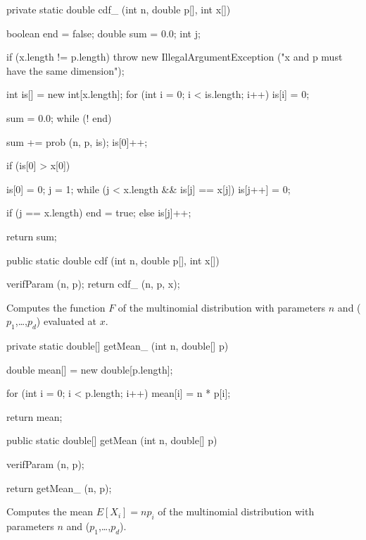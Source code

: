 \begin{code}\begin{hide}

   private static double cdf_ (int n, double p[], int x[]) {
      boolean end = false;
      double sum = 0.0;
      int j;

      if (x.length != p.length)
         throw new IllegalArgumentException ("x and p must have the same dimension");

      int is[] = new int[x.length];
      for (int i = 0; i < is.length; i++)
         is[i] = 0;

      sum = 0.0;
      while (! end) {
         sum += prob (n, p, is);
         is[0]++;

         if (is[0] > x[0]) {
            is[0] = 0;
            j = 1;
            while (j < x.length && is[j] == x[j])
               is[j++] = 0;

            if (j == x.length)
               end = true;
            else
               is[j]++;
         }
      }

      return sum;
   }\end{hide}

   public static double cdf (int n, double p[], int x[])\begin{hide} {
      verifParam (n, p);
      return cdf_ (n, p, x);
   }\end{hide}
\end{code}
\begin{tabb}
   Computes the function $F$ of the multinomial distribution with
   parameters $n$ and ($p_1$,\ldots,$p_d$) evaluated at $x$.
\end{tabb}
\begin{code}\begin{hide}

   private static double[] getMean_ (int n, double[] p) {
      double mean[] = new double[p.length];

      for (int i = 0; i < p.length; i++)
         mean[i] = n * p[i];

      return mean;
   }\end{hide}

   public static double[] getMean (int n, double[] p)\begin{hide} {
      verifParam (n, p);

      return getMean_ (n, p);
   }\end{hide}
\end{code}
\begin{tabb}
   Computes the mean $E[X_i] = np_i$ of the multinomial distribution
   with parameters $n$ and ($p_1$,\ldots,$p_d$).
\end{tabb}
